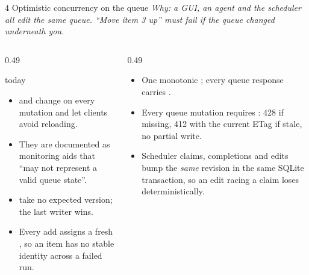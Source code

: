 \begin{frame}{4 \quad Optimistic concurrency on the queue}
    {\footnotesize\itshape Why: a GUI, an agent and the scheduler all edit the same queue. ``Move item 3 up''
    must fail if the queue changed underneath you.}
    \vspace{0.05cm}
    \begin{columns}[T]
        \begin{column}{0.49\textwidth}
            \begin{alertblock}{\legacy{} today}
                \footnotesize
                \begin{itemize}
                    \item {} and  change on every mutation and
                          let clients avoid reloading.
                    \item They are documented as monitoring aids that ``may not represent a valid queue
                          state''. 
                    \item {} take no expected version;
                          the last writer wins. 
                    \item Every add assigns a fresh , so an item has no stable identity
                          across a failed run. 
                \end{itemize}
            \end{alertblock}
        \end{column}
        \begin{column}{0.49\textwidth}
            \begin{block}{\vtwo{}}
                \footnotesize
                \begin{itemize}
                    \item One monotonic ; every queue response carries
                          .
                    \item Every queue mutation requires : 428 if missing, 412 with the
                          current ETag if stale, no partial write.
                    \item Scheduler claims, completions and edits bump the \emph{same} revision in the same
                          SQLite transaction, so an edit racing a claim loses deterministically.

\end{itemize}
\end{block}
\end{column}
\end{columns}
\end{frame}
